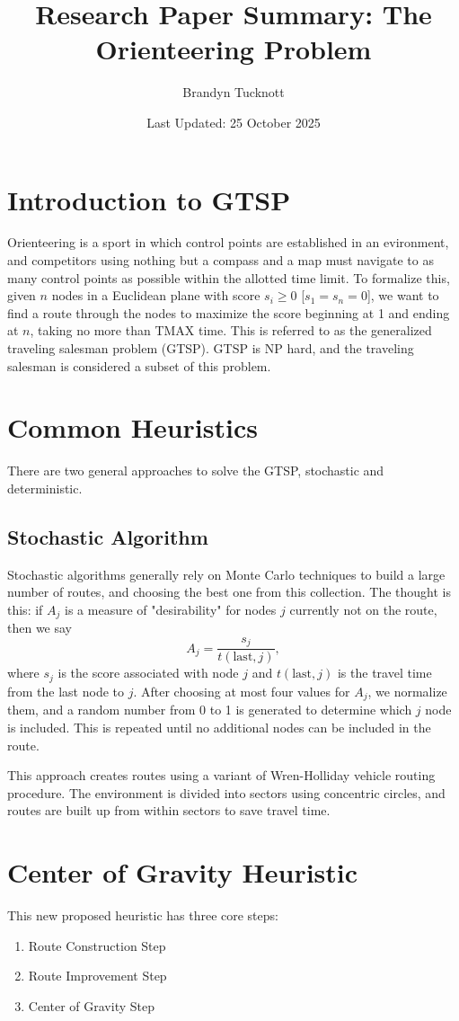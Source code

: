 \documentclass{exam}
\title{Research Paper Summary: The Orienteering Problem }
\author{Brandyn Tucknott}
\date{Last Updated: 25 October 2025}
\begin{document}
\maketitle

\section{Introduction to GTSP}
Orienteering is a sport in which control points are established in an evironment, and competitors using nothing but a compass
and a map must navigate to as many control points as possible within the allotted time limit. To formalize this, given $n$ nodes
in a Euclidean plane with score $s_i \geq 0$ [$s_1 = s_n = 0$], we want to find a route through the nodes to maximize the score
beginning at 1 and ending at $n$, taking no more than TMAX time. This is referred to as the generalized traveling salesman problem (GTSP).
GTSP is NP hard, and the traveling salesman is considered a subset of this problem.

\section{Common Heuristics}
There are two general approaches to solve the GTSP, stochastic and deterministic.

\subsection{Stochastic Algorithm}
Stochastic algorithms generally rely on Monte Carlo techniques to build a large number of routes, and choosing the best one from this collection.
The thought is this: if $A_j$ is a measure of "desirability" for nodes $j$ currently not on the route, then we say
$$A_j = \frac{s_j}{t(\text{last}, j)},$$
where $s_j$ is the score associated with node $j$ and $t(\text{last}, j)$ is the travel time from the last node to $j$. After choosing
at most four values for $A_j$, we normalize them, and a random number from 0 to 1 is generated to determine which $j$ node is included. This is 
repeated until no additional nodes can be included in the route.

This approach creates routes using a variant of Wren-Holliday vehicle routing procedure. The environment is divided into sectors 
using concentric circles, and routes are built up from within sectors to save travel time.

\section{Center of Gravity Heuristic}
This new proposed heuristic has three core steps:
\begin{enumerate}
    \item Route Construction Step
    \item Route Improvement Step
    \item Center of Gravity Step
\end{enumerate}
\end{document}
